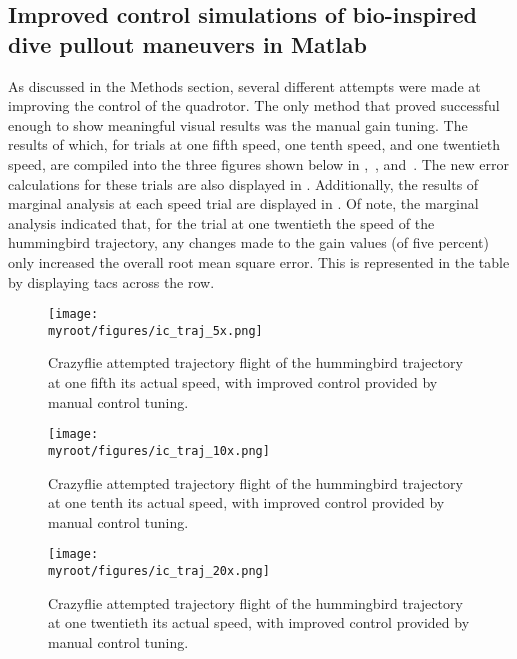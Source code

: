 \documentclass[onecolumn,10pt]{IEEEtran}
\newcommand{\myroot}{../}
\newcommand{\Matlab}{Matlab}
\begin{document}
\subsection{Improved control simulations of bio-inspired dive pullout maneuvers in \Matlab}

As discussed in the Methods section, several different attempts were made at improving the control of the quadrotor. The only method that proved successful enough to show meaningful visual results was the manual gain tuning. The results of which, for trials at one fifth speed, one tenth speed, and one twentieth speed, are compiled into the three figures shown below in ,~, and~. The new error calculations for these trials are also displayed in . Additionally, the results of marginal analysis at each speed trial are displayed in . Of note, the marginal analysis indicated that, for the trial at one twentieth the speed of the hummingbird trajectory, any changes made to the gain values (of five percent) only increased the overall root mean square error. This is represented in the table by displaying tacs across the row. 


\begin{figure}[p]
\begin{center}
\texttt{[image: \\myroot/figures/ic\_traj\_5x.png]}
\end{center}
\caption{Crazyflie attempted trajectory flight of the hummingbird trajectory at one fifth its actual speed, with improved control provided by manual control tuning.}
\label{fig:iconefifthspeed}
\end{figure}

\begin{figure}[p]
\begin{center}
\texttt{[image: \\myroot/figures/ic\_traj\_10x.png]}
\end{center}
\caption{Crazyflie attempted trajectory flight of the hummingbird trajectory at one tenth its actual speed, with improved control provided by manual control tuning.}
\label{fig:iconetenthspeed}
\end{figure}

\begin{figure}[p]
\begin{center}
\texttt{[image: \\myroot/figures/ic\_traj\_20x.png]}
\end{center}
\caption{Crazyflie attempted trajectory flight of the hummingbird trajectory at one twentieth its actual speed, with improved control provided by manual control tuning.}
\label{fig:iconetwentiethspeed}
\end{figure}
\end{document}
